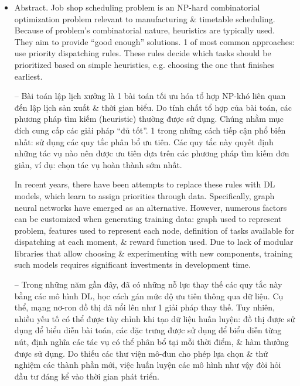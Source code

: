 \documentclass{article}
\begin{document}
\begin{itemize}
    \item {\sf Abstract.} Job shop scheduling problem is an NP-hard combinatorial optimization problem relevant to manufacturing \& timetable scheduling. Because of problem's combinatorial nature, heuristics are typically used. They aim to provide ``good enough'' solutions. 1 of most common approaches: use priority dispatching rules. These rules decide which tasks should be prioritized based on simple heuristics, e.g. choosing the one that finishes earliest.

    -- Bài toán lập lịch xưởng là 1 bài toán tối ưu hóa tổ hợp NP-khó liên quan đến lập lịch sản xuất \& thời gian biểu. Do tính chất tổ hợp của bài toán, các phương pháp tìm kiếm (heuristic) thường được sử dụng. Chúng nhằm mục đích cung cấp các giải pháp ``đủ tốt''. 1 trong những cách tiếp cận phổ biến nhất: sử dụng các quy tắc phân bổ ưu tiên. Các quy tắc này quyết định những tác vụ nào nên được ưu tiên dựa trên các phương pháp tìm kiếm đơn giản, ví dụ: chọn tác vụ hoàn thành sớm nhất.

    In recent years, there have been attempts to replace these rules with DL models, which learn to assign priorities through data. Specifically, graph neural networks have emerged as an alternative. However, numerous factors can be customized when generating training data: graph used to represent problem, features used to represent each node, definition of tasks available for dispatching at each moment, \& reward function used. Due to lack of modular libraries that allow choosing \& experimenting with new components, training such models requires significant investments in development time.

    -- Trong những năm gần đây, đã có những nỗ lực thay thế các quy tắc này bằng các mô hình DL, học cách gán mức độ ưu tiên thông qua dữ liệu. Cụ thể, mạng nơ-ron đồ thị đã nổi lên như 1 giải pháp thay thế. Tuy nhiên, nhiều yếu tố có thể được tùy chỉnh khi tạo dữ liệu huấn luyện: đồ thị được sử dụng để biểu diễn bài toán, các đặc trưng được sử dụng để biểu diễn từng nút, định nghĩa các tác vụ có thể phân bổ tại mỗi thời điểm, \& hàm thưởng được sử dụng. Do thiếu các thư viện mô-đun cho phép lựa chọn \& thử nghiệm các thành phần mới, việc huấn luyện các mô hình như vậy đòi hỏi đầu tư đáng kể vào thời gian phát triển.


\end{itemize}
\end{document}
